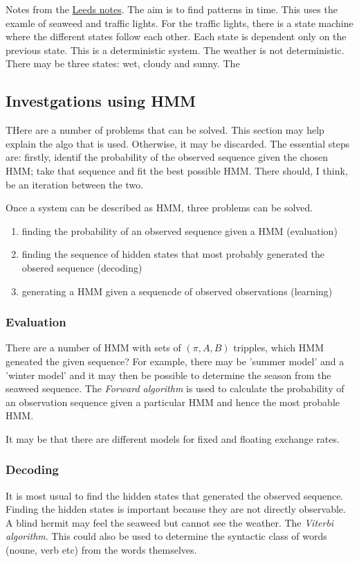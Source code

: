 \documentclass[12pt, a4paper, oneside]{article} %
\begin{document}
Notes from the \href{http://www.comp.leeds.ac.uk/roger/HiddenMarkovModels/html_dev/main.html}{Leeds notes}.  The aim is to find patterns in time. This uses the examle of seaweed and traffic lights.  For the traffic lights, there is a state machine where the different states follow each other. Each state is dependent only on the previous state. This is a deterministic system. The weather is not deterministic.  There may be three states:  wet, cloudy and sunny. The 

\subsection{Investgations using HMM}
THere are a number of problems that can be solved.  This section may help explain the algo that is used. Otherwise, it may be discarded.  The essential steps are:  firstly, identif the probability of the observed sequence given the chosen HMM; take that sequence and fit the best possible HMM.  There should, I think, be an iteration between the two. 

Once a system can be described as HMM, three problems can be solved. 
\begin{enumerate}
\item finding the probability of an observed sequence given a HMM (evaluation)
\item finding the sequence of hidden states that most probably generated the obsered sequence (decoding)
\item generating a HMM given a sequencde of observed observations (learning)
\end{enumerate}

\subsubsection{Evaluation}
There are a number of HMM with sets of $(\pi, A, B)$ tripples, which HMM geneated the given sequence?  For example, there may be 'summer model' and a 'winter model' and it may then be possible to determine the season from the seaweed sequence. The \emph{Forward algorithm} is used to calculate the probability of an observation sequence given a particular HMM and hence the most probable HMM.  

It may be that there are different models for fixed and floating exchange rates. 
\subsubsection{Decoding}
It is most usual to find the hidden states that generated the observed sequence.  Finding the hidden states is important because they are not directly observable.  A blind hermit may feel the seaweed but cannot see the weather. The \emph{Viterbi algorithm}.  This could also be used to determine the syntactic class of words (noune, verb etc) from the words themselves.  
\end{document}
